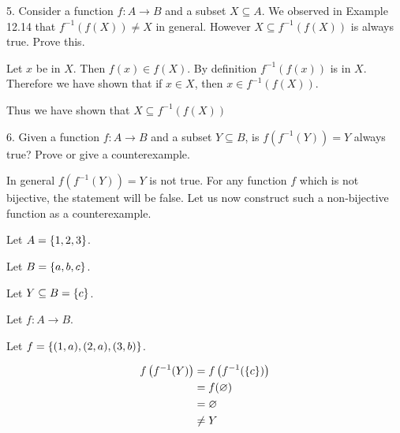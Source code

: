 \documentclass{article}
\begin{document}
\begin{exercise}{}{}
	{5. Consider a function $f: A \rightarrow B$ and a subset $X
			\subseteq A$. We observed in Example 12.14 that $f^{-1}(f(X)) \neq X$ in
		general. However $X \subseteq f^{-1}(f(X))$ is always true. Prove this.}
	\begin{alist}
		\item Let $x$ be in $X$. Then $f(x) \in f(X)$. By definition $f^{-1}(f(x))$ is in
		$X$. Therefore we have shown that if $x\in X$, then $x\in f^{-1}(f(X))$.
		\item Thus we have shown that $X \subseteq f^{-1}(f(X))$
	\end{alist}
\end{exercise}{}{}

\begin{exercise}{}{}
	{6. Given a function $f: A \rightarrow B$ and a subset $Y
			\subseteq B$, is $f\left(f^{-1}(Y)\right)=Y$ always true? Prove or give a
		counterexample.}
	\begin{alist}
		\item In general $f\left(f^{-1}(Y)\right)=Y$ is not true. For any function $f$
		which is not bijective, the statement will be false. Let us now construct
		such a non-bijective function as a counterexample.
		\item Let $A=\{1, 2, 3\}$.
		\item Let $B=\{a, b, c\}$.
		\item Let $Y\subseteq B = \{c\}$.
		\item Let $f: A \rightarrow B$.
		\item Let $f = \{(1, a), (2, a), (3, b)\}$.
	\end{alist}
	\begin{align*}
		f\left(f^{-1}(Y)\right) & = f\left(f^{-1}(\{c\})\right) \\
		                        & = f(\varnothing)                \\
		                        & = \varnothing                   \\
		                        & \neq Y
	\end{align*}
\end{exercise}{}{}
\end{document}
